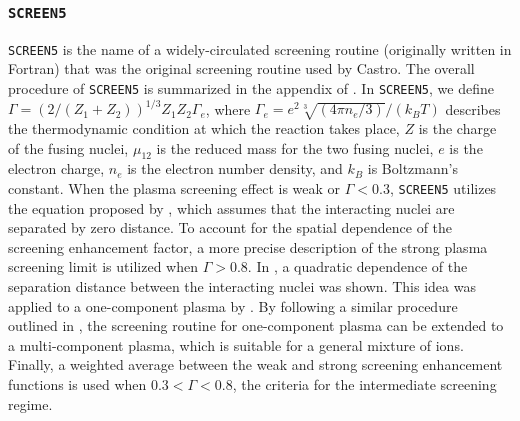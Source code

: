 \documentclass[preprint,times,tighten]{aastex631}
\newcommand{\castro}{{\sf Castro}}
\begin{document}


\subsubsection{{\tt SCREEN5}}

{\tt SCREEN5} is the name of a widely-circulated screening routine (originally written in Fortran) that was the original screening routine used by \castro.
The overall procedure of {\tt SCREEN5} is summarized in the appendix of \cite{Wallace:1982}. In {\tt SCREEN5}, we define $\Gamma = (2/(Z_1+Z_2))^{1/3}Z_1 Z_2 \Gamma_e$, where $\Gamma_e = e^2\sqrt[3]{(4\pi n_e/3)}/(k_BT)$ describes the thermodynamic condition at which the reaction takes place, $Z$ is the charge of the fusing nuclei, $\mu_{12}$ is the reduced mass for the two fusing nuclei, $e$ is the electron charge, $n_e$ is the electron number density, and $k_B$ is Boltzmann's constant. When the plasma screening effect is weak or $\Gamma < 0.3$, {\tt SCREEN5} utilizes the equation proposed by \cite{Graboske_1973, Dewitt_1973}, which assumes that the interacting nuclei are separated by zero distance. To account for the spatial dependence of the screening enhancement factor, a more precise description of the strong plasma screening limit is utilized when $\Gamma > 0.8$. In \cite{jancovici:1977}, a quadratic dependence of the separation distance between the interacting nuclei was shown. This idea was applied to a one-component plasma by \cite{alastuey:1978}. By following a similar procedure outlined in \cite{itoh:1979}, the screening routine for one-component plasma can be extended to a multi-component plasma, which is suitable for a general mixture of ions. Finally, a weighted average between the weak and strong screening enhancement functions is used when $0.3 < \Gamma < 0.8$, the criteria for the intermediate screening regime.





\end{document}
